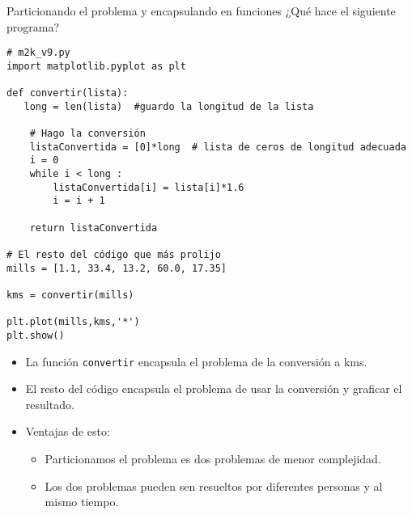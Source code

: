 \documentclass[9pt]{beamer}
\begin{document}
\begin{frame}[fragile]{Particionando el problema y encapsulando en funciones}
¿Qué hace el siguiente programa?
\footnotesize{\begin{verbatim}
# m2k_v9.py
import matplotlib.pyplot as plt

def convertir(lista):
   long = len(lista)  #guardo la longitud de la lista

    # Hago la conversión
    listaConvertida = [0]*long  # lista de ceros de longitud adecuada
    i = 0
    while i < long :
        listaConvertida[i] = lista[i]*1.6
        i = i + 1

    return listaConvertida

# El resto del código que más prolijo
mills = [1.1, 33.4, 13.2, 60.0, 17.35]

kms = convertir(mills)

plt.plot(mills,kms,'*')
plt.show()
\end{verbatim}}\pause
\begin{itemize}
	\item La función \verb|convertir| \alert{encapsula} el problema de la conversión a kms.\pause
	\item El resto del código \alert{encapsula} el problema de usar la conversión y graficar el resultado.\pause
	\item Ventajas de esto:\pause
	\begin{itemize}
		\item \footnotesize{Particionamos} el problema es dos problemas de menor complejidad.\pause
		\item Los dos problemas pueden sen resueltos por diferentes personas y al mismo tiempo.
	\end{itemize}
\end{itemize}

\end{frame}
\end{document}
